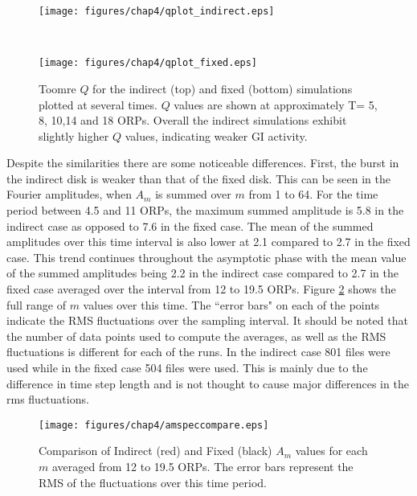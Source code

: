 \begin{figure}[p]
\centering
{}
\begin{minipage}[t]{6.3in}
\centering
\texttt{[image: figures/chap4/qplot\_indirect.eps]}
\end{minipage}\\
\begin{minipage}[t]{6.3in}
\centering
\texttt{[image: figures/chap4/qplot\_fixed.eps]}
\end{minipage}
\caption[Comparison of Toomre $Q$ for indirect and fixed simulations.]{Toomre $Q$ for the indirect (top) and fixed (bottom) simulations plotted at several times. $Q$ values are shown at approximately T= 5, 8, 10,14 and 18 ORPs. Overall the indirect simulations exhibit slightly higher $Q$ values, indicating weaker GI activity.}
\label{SMqplot}
\end{figure}

Despite the similarities there are some noticeable differences. First, the burst in the indirect disk is weaker than that of the fixed disk. This can be seen in the Fourier amplitudes, when $A_m$ is summed over $m$ from 1 to 64. For the time period between 4.5 and 11 ORPs, the maximum summed amplitude is 5.8 in the indirect case as opposed to 7.6 in the fixed case. The mean of the summed amplitudes over this time interval is also lower at 2.1 compared to 2.7 in the fixed case. This trend continues throughout the asymptotic phase with the mean value of the summed amplitudes being 2.2 in the indirect case compared to 2.7 in the fixed case averaged over the interval from 12 to 19.5 ORPs. Figure \ref{SMamspec} shows the full range of $m$ values over this time. The ``error bars" on each of the points indicate the RMS fluctuations over the sampling interval. It should be noted that the number of data points used to compute the averages, as well as the RMS fluctuations is different for each of the runs. In the indirect case 801 files were used while in the fixed case 504 files were used. This is mainly due to the difference in time step length and is not thought to cause major differences in the rms fluctuations.
\begin{figure}[p]
\centering
\texttt{[image: figures/chap4/amspeccompare.eps]}
\caption[Comparison of Indirect and Standard asymptotic $A_m$ values]{Comparison of Indirect (red) and Fixed (black) $A_m$ values for each $m$ averaged from 12 to 19.5 ORPs. The error bars represent the RMS of the fluctuations over this time period.}
\label{SMamspec}
\end{figure}

